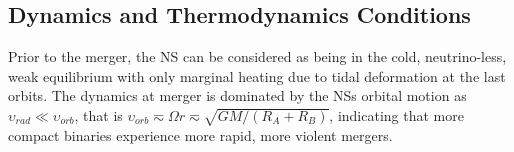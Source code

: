 \subsection{Dynamics and Thermodynamics Conditions}

Prior to the merger, the \ac{NS} can be considered as being in the cold, neutrino-less, 
weak equilibrium with only marginal heating due to tidal deformation at the last orbits.
The dynamics at merger is dominated by the \acp{NS} orbital motion
as $\upsilon_{rad}\ll\upsilon_{orb}$, 
that is $\upsilon_{orb}\eqsim\Omega r\eqsim\sqrt{GM/(R_A + R_B)}$, indicating that 
more compact binaries experience more rapid, more violent mergers.

